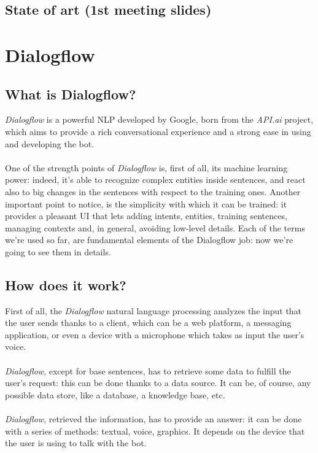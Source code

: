 \documentclass[a4paper,12pt]{report}
\begin{document}
	\section{State of art (1st meeting slides)}

\chapter{Dialogflow}
	\section{What is Dialogflow?}
	\textit{Dialogflow} is a powerful NLP developed by Google, born from the \textit{API.ai} project, which aims to provide a rich conversational experience and a strong ease in using and developing the bot.\\\\
	One of the strength points of \textit{Dialogflow} is, first of all, its machine learning power: indeed, it's able to recognize complex entities inside sentences, and react also to big changes in the sentences with respect to the training ones. Another important point to notice, is the simplicity with which it can be trained: it provides a pleasant UI that lets adding intents, entities, training sentences, managing contexts and, in general, avoiding low-level details. Each of the terms we're used so far, are fundamental elements of the Dialogflow job: now we're going to see them in details.
	
	\section{How does it work?}
	First of all, the \textit{Dialogflow} natural language processing analyzes the input that the user sends thanks to a client, which can be a web platform, a messaging application, or even a device with a microphone which takes as input the user's voice.\\\\
	\textit{Dialogflow}, except for base sentences, has to retrieve some data to fulfill the user's request: this can be done thanks to a data source. It can be, of course, any possible data store, like a database, a knowledge base, etc.\\\\
	\textit{Dialogflow}, retrieved the information, has to provide an answer: it can be done with a series of methods: textual, voice, graphics. It depends on the device that the user is using to talk with the bot.
	
\end{document}
